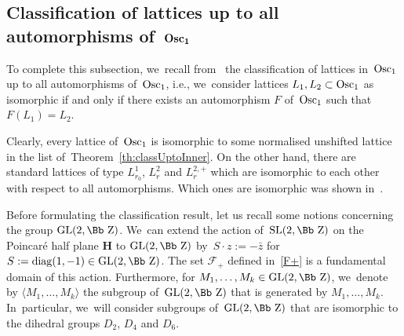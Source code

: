 \documentclass[10pt,a4paper]{amsart}
\newcommand\ZZ{{\mbox{\Bb Z}}}
\newcommand\cF{{\mathcal F}}
\newcommand{\GL}{\mathop{{\rm GL}}}
\newcommand{\SL}{\mathop{{\rm SL}}}
\newcommand{\Osc}{{\rm Osc}}
\newcommand{\diag}{\mathop{{\rm diag}}}
\newcommand\la{\langle}
\newcommand\ra{\rangle}
\numberwithin{equation}{section}
\begin{document}
\subsection[Classification of lattices up to all automorphisms of~$\Osc_1$]
{Classification of lattices up to all automorphisms of~$\boldsymbol{\Osc_1}$}

To complete this subsection, we~recall from~\cite{F} the classification of lattices in~$\Osc_1$ up to all automorphisms of~$\Osc_1$, i.e., we~consider lattices $L_1,L_2\subset \Osc_1$ as isomorphic if and only if there exists an automorphism $F$ of~$\Osc_1$ such that $F(L_1)=L_2$.

Clearly, every lattice of~$\Osc_1$ is isomorphic to some normalised unshifted lattice in the list of~Theorem~\ref{th:classUptoInner}. On the other hand, there are standard lattices of type $L^1_{r_0}$, $L^2_r$ and $L^{2,+}_r$ which are isomorphic to each other with respect to all automorphisms. Which ones are isomorphic was shown in~\cite{F}.

Before formulating the classification result, let us recall some notions concerning the group $\GL(2,\ZZ)$. We~can extend the action of~$\SL(2,\ZZ)$ on the Poincar\'e half plane $\textbf{H}$ to $\GL(2,\ZZ)$ by~$S\cdot z:=-\bar z$ for $S:=\diag(1,-1)\in\GL(2,\ZZ)$. The set
 $\cF_+$ defined in~\eqref{F+}
 is a fundamental domain of this action. Furthermore, for $M_1,\dots,M_k\in\GL(2,\ZZ)$, we~denote by $\la M_1,\dots,M_k \ra$ the subgroup of~$\GL(2,\ZZ)$ that is generated by $M_1,\dots,M_k$. In~particular, we~will consider subgroups of~$\GL(2,\ZZ)$ that are isomorphic to the dihedral groups $D_2$, $D_4$ and $D_6$.
\end{document}
